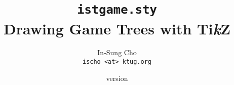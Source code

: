 \documentclass[a4paper]{oblivoir}
\newcommand*\Tikz{Ti\textit{k}Z}
\newcommand*\tikzlogo{Ti\textit{k}Z}
\newenvironment{keywords}{%
	\par\vskip2pt
	\noindent\hangfrom{\textsc{Keywords: }}%
}
\begin{document}
\title{\texttt{istgame.sty} \\
Drawing Game Trees with \tikzlogo}
\author{In-Sung Cho \\  \texttt{ischo <at> ktug.org}}
\date{\tmpdate\quad version \tmpversion}

\frontmatter
\maketitle

\begin{abstract}
This package provides macros based on \Tikz\ to draw a game tree. The main idea underlying the core macros here is the completion of a whole tree using a sequence of simple `parent-child' tree structures, with no longer nested relations involved like down to grandchildren or to great-grandchildren.

\begin{keywords}
game trees, tikz, nodes, branches, information sets, subgames
\end{keywords}
\end{abstract}

\tableofcontents*

\mainmatter

%

\end{document}
